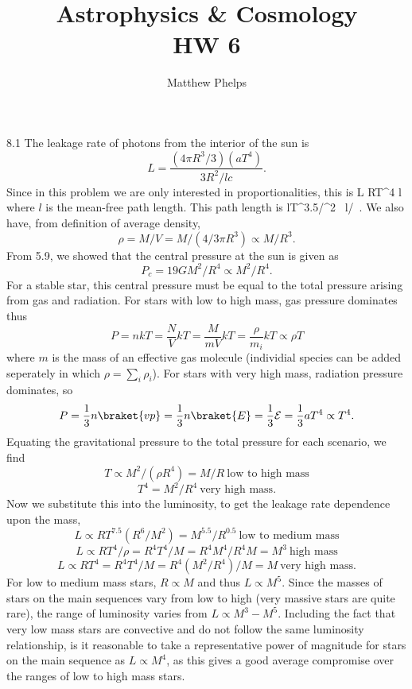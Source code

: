 \documentclass[10pt,letterpaper]{article}
\title{Astrophysics \& Cosmology\\HW 6}
\author{Matthew Phelps}
\date{}
\begin{document}
\maketitle

\benum

\item[8.1]
The leakage rate of photons from the interior of the sun is 
\[
	L = \frac{ (4\pi R^3/3)(aT^4)}{3R^2/lc}.
\]
Since in this problem we are only interested in proportionalities, this is
\be
	L \propto RT^4 l
\ee
where $l$ is the mean-free path length. This path length is
\be
	l\propto T^{3.5}/\rho^2\ 
\ee
\be
	l/\rho\ .
\ee
We also have, from definition of average density,
\[
	\rho = M/V = M/(4/3\pi R^3)\propto M/R^3.
\]
From 5.9, we showed that the central pressure at the sun is given as
\[
	P_c = 19 G M^2/R^4 \propto M^2/R^4.
\]
For a stable star, this central pressure must be equal to the total pressure arising from gas and radiation. For stars with low to high mass, gas pressure dominates thus
\[
	P = nkT = \frac{N}{V}kT = \frac{M}{mV}kT = \frac{\rho}{m_i}kT \propto \rho T
\]
where $m$ is the mass of an effective gas molecule (individial species can be added seperately in which $\rho = \sum_i \rho_i$).
For stars with very high mass, radiation pressure dominates, so
\[
	P = \frac13 n\braket{vp} = \frac13 n\braket{E} = \frac13 \mathcal E = \frac13 aT^4 \propto T^4.
\]
Equating the gravitational pressure to the total pressure for each scenario, we find
\[
	T \propto  M^2/(\rho R^4) = M/R\ \text{low to high mass}
\]
\[
	T^4 = M^2/R^4  \ \text{very high mass}.
\]
Now we substitute this into the luminosity, to get the leakage rate dependence upon the mass,
\[
	L \propto RT^{7.5} (R^6/M^2) = M^{5.5}/R^{0.5}\ \text{low to medium mass}
\]
\[
	L \propto RT^4/\rho = R^4 T^4/M = R^4 M^4/R^4M = M^3\ \text{high mass}
\]
\[
	L \propto RT^4 = R^4 T^4/M = R^4(M^2/R^4)/M = M\ \text{very high mass}.
\] 
For low to medium mass stars, $ R\propto M$ and thus $L\propto M^5$. Since the masses of stars on the main sequences vary from low to high (very massive stars are quite rare), the range of luminosity varies from $L \propto M^3 - M^5$. Including the fact that very low mass stars are convective and do not follow the same luminosity relationship, is it reasonable to take a representative power of magnitude for stars on the main sequence as $L\propto M^4$, as this gives a good average compromise over the ranges of low to high mass stars. 
\eenum
\end{document}
